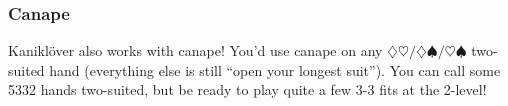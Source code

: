 \documentclass[a4paper, twoside, 11pt]{article}
\begin{document}
\begin{multicols}{3}
\itshape

\subsubsection*{Canape}
 Kaniklöver also works with canape! You'd use canape on any $\diamondsuit\heartsuit/ \diamondsuit\spadesuit/ \heartsuit\spadesuit$ two-suited hand (everything else is still ``open your longest suit''). You can call some 5332 hands two-suited, but be ready to play quite a few 3-3 fits at the 2-level!










\end{multicols}
\end{document}

